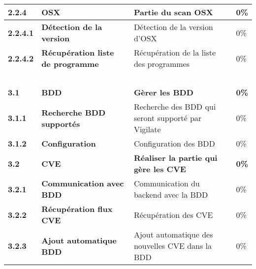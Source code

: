 \begin{supertabular}{|p{2.2cm} p{6cm}|p{5cm}|R{2cm}|}
  \hspace{6pt}
  \textbf{2.2.4}  & \textbf{OSX} & Partie du scan OSX & 0\% \\
  \hline

  \hspace{12pt}
  \textbf{2.2.4.1}  & \textbf{Détection de la version} & Détection de la version d'OSX & 0\% \\
  \hline

  \hspace{12pt}
  \textbf{2.2.4.2}  & \textbf{Récupération liste de programme} & Récupération de la liste des programmes & 0\% \\
  \hline




  \textcolor{white}{\textbf{3}}  & \textcolor{white}{\textbf{Backend}} & \textcolor{white}{\textbf{Réaliser un backend}} & \textcolor{white}{\textbf{0\%}} \\
  \hline

  \textbf{3.1}  & \textbf{BDD} & \textbf{Gèrer les BDD} & \textbf{0\%} \\
  \hline

  \hspace{6pt}
  \textbf{3.1.1}  & \textbf{Recherche BDD supportés} & Recherche des BDD qui seront supporté par Vigilate & 0\% \\
  \hline

  \hspace{6pt}
  \textbf{3.1.2}  & \textbf{Configuration} & Configuration des BDD & 0\% \\
  \hline


  \textbf{3.2}  & \textbf{CVE} & \textbf{Réaliser la partie qui gère les CVE} & \textbf{0\%} \\
  \hline

  \hspace{6pt}
  \textbf{3.2.1}  & \textbf{Communication avec BDD} & Communication du backend avec la BDD  & 0\% \\
  \hline

  \hspace{6pt}
  \textbf{3.2.2}  & \textbf{Récupération flux CVE} & Récupération des CVE & 0\% \\
  \hline

  \hspace{6pt}
  \textbf{3.2.3}  & \textbf{Ajout automatique BDD} & Ajout automatique des nouvelles CVE dans la BDD & 0\% \\
  \hline




\end{supertabular}
